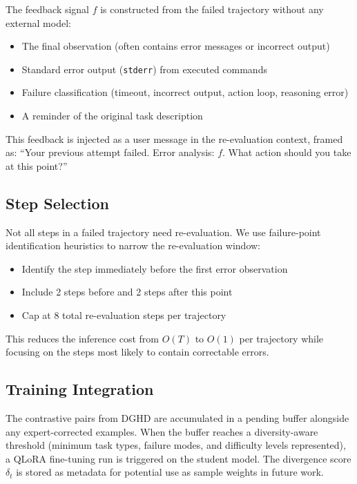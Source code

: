 \documentclass[11pt]{article}
\newcommand{\ours}{DGHD}
\newcommand{\divergence}{\delta}
\begin{document}
The feedback signal $f$ is constructed from the failed trajectory without any external model:
\begin{itemize}
    \item The final observation (often contains error messages or incorrect output)
    \item Standard error output (\texttt{stderr}) from executed commands
    \item Failure classification (timeout, incorrect output, action loop, reasoning error)
    \item A reminder of the original task description
\end{itemize}

This feedback is injected as a user message in the re-evaluation context, framed as: ``Your previous attempt failed. Error analysis: $f$. What action should you take at this point?''

\subsection{Step Selection}

Not all steps in a failed trajectory need re-evaluation. We use failure-point identification heuristics \citep{ragen2026} to narrow the re-evaluation window:
\begin{itemize}
    \item Identify the step immediately before the first error observation
    \item Include 2 steps before and 2 steps after this point
    \item Cap at 8 total re-evaluation steps per trajectory
\end{itemize}

This reduces the inference cost from $O(T)$ to $O(1)$ per trajectory while focusing on the steps most likely to contain correctable errors.

\subsection{Training Integration}

The contrastive pairs from \ours{} are accumulated in a pending buffer alongside any expert-corrected examples. When the buffer reaches a diversity-aware threshold (minimum task types, failure modes, and difficulty levels represented), a QLoRA fine-tuning run is triggered on the student model. The divergence score $\divergence_t$ is stored as metadata for potential use as sample weights in future work.
\end{document}
